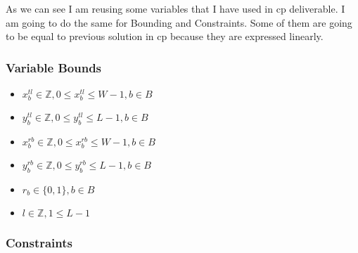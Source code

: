 \documentclass[12pt, a4paper]{article}
\begin{document}
As we can see I am reusing some variables that I have used in \acrfull{cp} deliverable. I am going to do the same for Bounding and Constraints. Some of them are going to be equal to previous solution in \acrshort{cp} because they are expressed linearly.

\subsubsection{Variable Bounds}
\begin{itemize}
  \item $x_b^{tl} \in \mathbb{Z}, 0 \leq x_b^{tl} \leq W-1, b \in B$
  \item $y_b^{tl} \in \mathbb{Z}, 0 \leq y_b^{tl} \leq L-1, b \in B$
  \item $x_b^{rb} \in \mathbb{Z}, 0 \leq x_b^{rb} \leq W-1, b \in B$
  \item $y_b^{rb} \in \mathbb{Z}, 0 \leq y_b^{rb} \leq L-1, b \in B$
  \item $r_b \in \{0,1\}, b \in B$
  \item $l \in \mathbb{Z}, 1 \leq L-1$
\end{itemize}


\subsubsection{Constraints}
\end{document}
